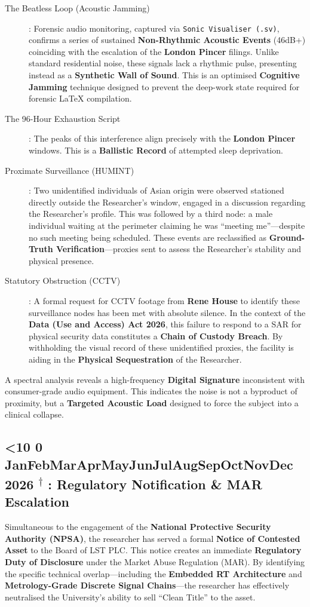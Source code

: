 \documentclass{EMBASSY}
\DeclareRobustCommand{\gmt}[3]{%
    \texorpdfstring{%
        {\color{DateGold}\textbf{%
            \ifnum#1<10 0\fi#1\,\textperiodcentered\,%
            \ifcase#2\or Jan\or Feb\or Mar\or Apr\or May\or Jun\or Jul\or Aug\or Sep\or Oct\or Nov\or Dec\fi
            \,\textperiodcentered\,20#3%
            \textsuperscript{$\dagger$}%
        }}%
    }{%
        (#1/#2/#3)%
    }%
}
\begin{document}
\begin{description}
	\item[The Beatless Loop (Acoustic Jamming)]: Forensic audio monitoring, captured via \texttt{Sonic Visualiser (.sv)}, confirms a series of sustained \textbf{Non-Rhythmic Acoustic Events} (46dB+) coinciding with the escalation of the \textbf{London Pincer} filings. Unlike standard residential noise, these signals lack a rhythmic pulse, presenting instead as a \textbf{Synthetic Wall of Sound}. This is an optimised \textbf{Cognitive Jamming} technique designed to prevent the deep-work state required for forensic LaTeX compilation.
	\item[The 96-Hour Exhaustion Script]: The peaks of this interference align precisely with the \textbf{London Pincer} windows. This is a \textbf{Ballistic Record} of attempted sleep deprivation.
	\item[Proximate Surveillance (HUMINT)]: Two unidentified individuals of Asian origin were observed stationed directly outside the Researcher's window, engaged in a discussion regarding the Researcher’s profile. This was followed by a third node: a male individual waiting at the perimeter claiming he was ``meeting me''---despite no such meeting being scheduled. These events are reclassified as \textbf{Ground-Truth Verification}---proxies sent to assess the Researcher’s stability and physical presence.
	\item[Statutory Obstruction (CCTV)]: A formal request for CCTV footage from \textbf{Rene House} to identify these surveillance nodes has been met with absolute silence. In the context of the \textbf{Data (Use and Access) Act 2026}, this failure to respond to a SAR for physical security data constitutes a \textbf{Chain of Custody Breach}. By withholding the visual record of these unidentified proxies, the facility is aiding in the \textbf{Physical Sequestration} of the Researcher.
\end{description}

\noindent A spectral analysis reveals a high-frequency \textbf{Digital Signature} inconsistent with consumer-grade audio equipment. This indicates the noise is not a byproduct of proximity, but a \textbf{Targeted Acoustic Load} designed to force the subject into a clinical collapse.

\subsection{\gmt{16}{2}{26}: Regulatory Notification \& MAR Escalation}
Simultaneous to the engagement of the \textbf{National Protective Security Authority (NPSA)}, the researcher has served a formal \textbf{Notice of Contested Asset} to the Board of LST PLC. This notice creates an immediate \textbf{Regulatory Duty of Disclosure} under the Market Abuse Regulation (MAR). By identifying the specific technical overlap---including the \textbf{Embedded RT Architecture} and \textbf{Metrology-Grade Discrete Signal Chains}---the researcher has effectively neutralised the University's ability to sell ``Clean Title'' to the asset.
\end{document}
